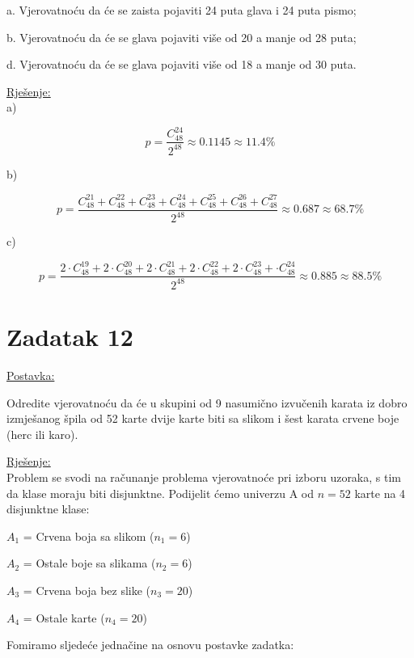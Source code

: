 \documentclass[12pt]{article}
\begin{document}
\begin{center}

a. Vjerovatnoću da će se zaista pojaviti 24 puta glava i 24 puta pismo;

b. Vjerovatnoću da će se glava pojaviti više od 20 a manje od 28 puta;

d. Vjerovatnoću da će se glava pojaviti više od 18 a manje od 30 puta.	
\end{center}

\underline{Rješenje:}\\

a)

$$p = \frac{C_{48}^{24}}{2^{48}} \approx 0.1145 \approx 11.4\%$$

b)

$$p = \frac{ C_{48}^{21} + C_{48}^{22} + C_{48}^{23} + C_{48}^{24} + C_{48}^{25} + C_{48}^{26} + C_{48}^{27}}{2^{48}} \approx 0.687 \approx 68.7\%$$

c)

$$p = \frac{2 \cdot C_{48}^{19} + 2 \cdot C_{48}^{20} + 2 \cdot C_{48}^{21} + 2 \cdot C_{48}^{22} + 2 \cdot C_{48}^{23} + \cdot C_{48}^{24}}{2^{48}} \approx 0.885 \approx 88.5\%$$

\newpage
\section*{Zadatak 12\label{Z12}}	 

\underline{Postavka:}
	
Odredite vjerovatnoću da će u skupini od 9 nasumično izvučenih karata iz dobro izmješanog špila od 52 karte dvije karte biti sa slikom i šest karata crvene boje (herc ili karo).

\underline{Rješenje:}\\

Problem se svodi na računanje problema vjerovatnoće pri izboru uzoraka, s tim da klase moraju biti disjunktne. Podijelit ćemo univerzu A od $n = 52$ karte na 4 disjunktne klase:

\begin{center}
$A_{1}$ = Crvena boja sa slikom ($n_{1} = 6$)

$A_{2}$ = Ostale boje sa slikama ($n_{2} = 6$)

$A_{3}$ = Crvena boja bez slike ($n_{3} = 20$)

$A_{4}$ = Ostale karte ($n_{4} = 20$)\\
\end{center}

Fomiramo sljedeće jednačine na osnovu postavke zadatka:
\end{document}
